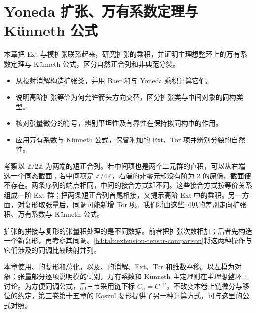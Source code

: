 
\chapter{Yoneda 扩张、万有系数定理与 Künneth 公式}
\label{b4:ch:09}

\begin{chapterabstract}
	本章把 Ext 与模扩张联系起来，研究扩张的乘积，并证明主理想整环上的万有系数定理与 Künneth 公式，区分自然正合列和非典范分裂。
\end{chapterabstract}

\begin{learninggoals}
	\begin{itemize}
		\item 从投射消解构造扩张类，并用 Baer 和与 Yoneda 乘积计算它们。
		\item 说明高阶扩张等价为何允许箭头方向交替，区分扩张类与中间对象的同构类型。
		\item 核对张量微分的符号，辨别平坦性及有界性在保持拟同构中的作用。
		\item 应用万有系数与 Künneth 公式，保留附加的 Ext、Tor 项并辨别分裂的自然性。
	\end{itemize}
\end{learninggoals}

考察以 \(\mathbb Z/2\mathbb Z\) 为两端的短正合列。若中间项也是两个二元群的直积，可以从右端选一个同态截面；若中间项是 \(\mathbb Z/4\mathbb Z\)，右端的非零元却没有阶为 \(2\) 的原像，截面便不存在。两条序列的端点相同，中间的接合方式却不同。这些接合方式按等价关系组成一阶 Ext 群；把两条短正合列首尾相接，又提示高阶 Ext 中的乘积。另一方面，对复形取张量后，同调可能新增 Tor 项。我们将由这些可见的差别走向扩张积、万有系数与 Künneth 公式。

\ProseParagraphBreak
扩张的拼接与复形的张量积处理的是不同数据。前者把扩张次数相加；后者先构造一个新复形，再考察其同调。\cref{b4:tab:extension-tensor-comparison}将这两种操作与它们涉及的同调比较映射并列。



本章使用、的复形和总化，以及、的消解、Ext、Tor 和维数平移。以左模为对象；张量部分逐项说明模的侧别，万有系数和 Künneth 主定理则在主理想整环上讨论。为方便同调公式，后三节采用链下标 \(C_n=C^{-n}\)，不改变本卷上链微分与移位的约定。第三卷第十五章的 Koszul 复形提供了另一种计算方式，可与这里的公式对照。

